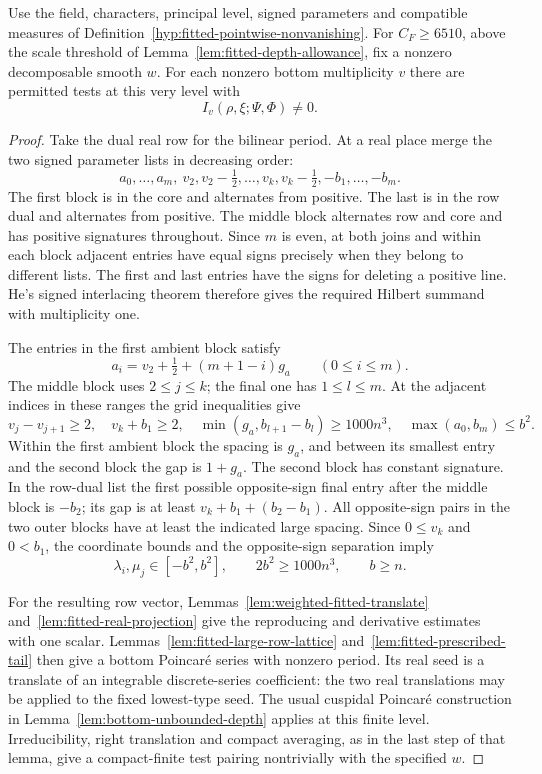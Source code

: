 \begin{auxlemma}\label{lem:fitted-completed-nonvanishing}
Use the field, characters, principal level, signed parameters and
compatible measures of Definition~\ref{hyp:fitted-pointwise-nonvanishing}.
For \(C_F\ge6510\), above the scale threshold of
Lemma~\ref{lem:fitted-depth-allowance}, fix a nonzero decomposable
smooth \(w\). For each nonzero bottom multiplicity \(v\) there are
permitted tests at this very level with
\[
                    I_v(\rho,\xi;\Psi,\Phi)\ne0 .
\]
\end{auxlemma}
\begin{proof}
Take the dual real row for the bilinear period. At a real place merge
the two signed parameter lists in decreasing order:
\[
 a_0,\ldots,a_m,\ v_2,v_2-\tfrac12,\ldots,v_k,v_k-\tfrac12,          -b_1,\ldots,-b_m .
\]
The first block is in the core and alternates from positive. The last
is in the row dual and alternates from positive. The middle block
alternates row and core and has positive signatures throughout. Since
\(m\) is even, at both joins and within each block adjacent entries
have equal signs precisely when they belong to different lists.
The first and last entries have the signs for deleting a positive
line. He's signed interlacing theorem therefore gives the required
Hilbert summand with multiplicity one. \cite[Theorem 0.1]{he-discrete-branch}

The entries in the first ambient block satisfy
\[
        a_i=v_2+\tfrac12+(m+1-i)g_a\qquad(0\le i\le m).
\]
The middle block uses \(2\le j\le k\); the final one has
\(1\le l\le m\). At the adjacent indices in these ranges the grid inequalities give
\[
 v_j-v_{j+1}\ge2,\quad v_k+b_1\ge2,\quad
 \min(g_a,b_{l+1}-b_l)\ge1000n^3,\quad
                   \max(a_0,b_m)\le b^2.
\]
Within the first ambient block the spacing is \(g_a\), and between
its smallest entry and the second block the gap is \(1+g_a\).
The second block has constant signature. In the row-dual list
the first possible opposite-sign final entry after the middle block
is \(-b_2\); its gap is at least \(v_k+b_1+(b_2-b_1)\).
All opposite-sign pairs in the two outer blocks have at least the
indicated large spacing. Since \(0\le v_k\) and \(0<b_1\), the
coordinate bounds and the opposite-sign separation imply
\[
   \lambda_i,\mu_j\in[-b^2,b^2],\qquad
   2b^2\ge1000n^3,\qquad b\ge n .
\]

For the resulting row vector, Lemmas~\ref{lem:weighted-fitted-translate}
and~\ref{lem:fitted-real-projection} give the reproducing and derivative
estimates with one scalar. Lemmas~\ref{lem:fitted-large-row-lattice}
and~\ref{lem:fitted-prescribed-tail} then give a bottom Poincar\'e
series with nonzero period. Its real seed is a translate of an
integrable discrete-series coefficient: the two real translations
may be applied to the fixed lowest-type seed. The usual cuspidal
Poincar\'e construction in Lemma~\ref{lem:bottom-unbounded-depth}
applies at this finite level. Irreducibility, right translation and
compact averaging, as in the last step of that lemma, give a
compact-finite test pairing nontrivially with the specified \(w\).


\end{proof}
